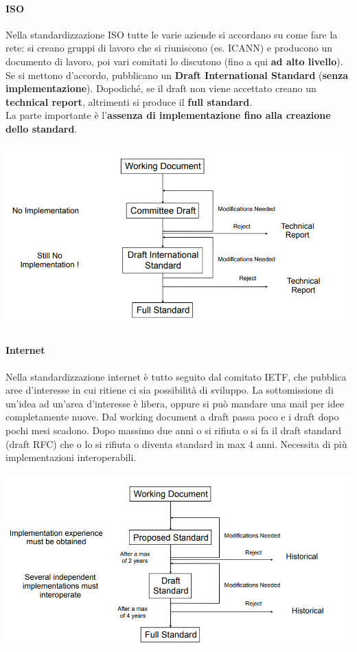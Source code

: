 \documentclass[10pt]{book}
\begin{document}
\paragraph{ISO} Nella standardizzazione ISO tutte le varie aziende si accordano su come fare la rete: si creano gruppi di lavoro che si riuniscono (es. ICANN) e producono un documento di lavoro, poi vari comitati lo discutono (fino a qui \textbf{ad alto livello}).\\
Se si mettono d'accordo, pubblicano un \textbf{Draft International Standard} (\textbf{senza implementazione}). Dopodiché, se il draft non viene accettato creano un \textbf{technical report}, altrimenti si produce il \textbf{full standard}.\\
La parte importante è l'\textbf{assenza di implementazione fino alla creazione dello standard}.
\begin{center}
	\includegraphics[scale=0.7]{stdiso.png}
\end{center}
\paragraph{Internet} Nella standardizzazione internet è tutto seguito dal comitato IETF, che pubblica aree d'interesse in cui ritiene ci sia possibilità di sviluppo. La sottomissione di un'idea ad un'area d'interesse è libera, oppure si può mandare una mail per idee completamente nuove. Dal working document a draft passa poco e i draft dopo pochi mesi scadono. Dopo massimo due anni o si rifiuta o si fa il draft standard (draft RFC) che o lo si rifiuta o diventa standard in max 4 anni. Necessita di più implementazioni interoperabili.
\begin{center}
	\includegraphics[scale=0.7]{stdietf.png}
\end{center}
\end{document}
